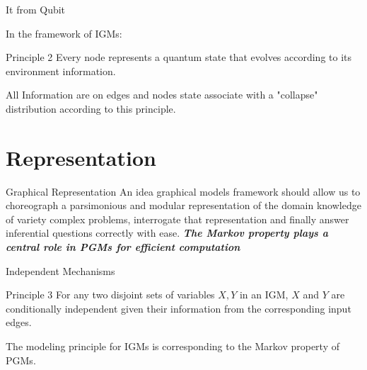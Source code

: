 \documentclass[10pt]{beamer}
\begin{document}
\begin{CJK*}{UTF8}{gbsn}
\begin{frame}{It from Qubit}
    
    In the framework of IGMs: 
    \begin{block}{Principle 2}
    \label{prin:quantum}
    Every node represents a quantum state that evolves according to its environment information.
    \end{block}
    All Information are on edges and nodes state associate with a "collapse" distribution according to this principle.

    
\end{frame}

\section{Representation}



\begin{frame}{Graphical Representation}
    An idea graphical models framework should allow us to choreograph a parsimonious and modular representation of the domain knowledge of variety complex problems, interrogate that representation and finally answer inferential questions correctly with ease. \textbf{\emph{The Markov property plays a central role in PGMs for efficient computation}}
  
\end{frame}


\begin{frame}{Independent Mechanisms}
    \begin{block}{Principle 3}
    \label{prin:indep}
    For any two disjoint sets of variables $X, Y$ in  an IGM, $X$ and $Y$ are conditionally independent given their information from the corresponding input edges.
    \end{block}
    
    The modeling principle for IGMs is corresponding to the Markov property of PGMs.
    
\end{frame}

\usetikzlibrary{arrows}
\usetikzlibrary{arrows.meta, calc}
\usetikzlibrary{shapes,positioning,decorations.markings}
\usetikzlibrary{arrows, automata, chains, positioning, shapes.geometric, shapes.symbols}
\usetikzlibrary{shapes,decorations,arrows,calc,arrows.meta,fit,positioning}


\end{CJK*}
\end{document}
